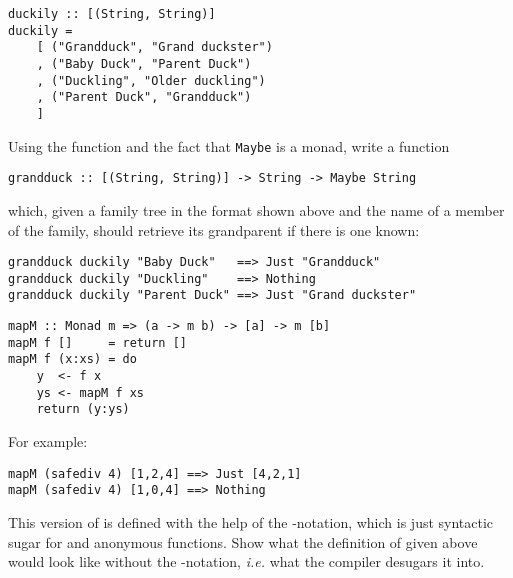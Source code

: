 \begin{verbatim}
duckily :: [(String, String)]
duckily =
    [ ("Grandduck", "Grand duckster")
    , ("Baby Duck", "Parent Duck")
    , ("Duckling", "Older duckling")
    , ("Parent Duck", "Grandduck")
    ]
\end{verbatim}
Using the  function and the fact that \texttt{\small Maybe} is a monad, write a function 
\begin{verbatim}
grandduck :: [(String, String)] -> String -> Maybe String
\end{verbatim}
which, given a family tree in the format shown above and the name of a member of the family, should retrieve its grandparent if there is one known:
\begin{verbatim}
grandduck duckily "Baby Duck"   ==> Just "Grandduck"
grandduck duckily "Duckling"    ==> Nothing
grandduck duckily "Parent Duck" ==> Just "Grand duckster"
\end{verbatim}


\taskLine 

\begin{verbatim}
mapM :: Monad m => (a -> m b) -> [a] -> m [b]
mapM f []     = return [] 
mapM f (x:xs) = do 
    y  <- f x 
    ys <- mapM f xs
    return (y:ys)
\end{verbatim}
For example:
\begin{verbatim}
mapM (safediv 4) [1,2,4] ==> Just [4,2,1]
mapM (safediv 4) [1,0,4] ==> Nothing
\end{verbatim}
This version of  is defined with the help of the -notation, which is just syntactic sugar for \haskellIn{(>>=)} and anonymous functions. Show what the definition of  given above would look like without the -notation, \emph{i.e.} what the compiler desugars it into.


